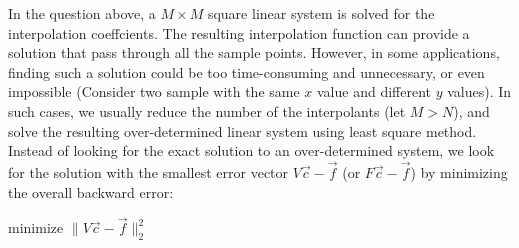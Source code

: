 \documentclass[10pt]{article}
\begin{document}
In the question above, a $M\times M$ square linear system is solved for the interpolation coeffcients.
The resulting interpolation function can provide a solution that pass through all the sample points.
However, in some applications, finding such a solution could be too time-consuming and unnecessary, or even impossible (Consider two sample with the same $x$ value and different $y$ values).
In such cases, we usually reduce the number of the interpolants (let $M>N$), and solve the resulting over-determined linear system using least square method.
Instead of looking for the exact solution to an over-determined system, we look for the solution with the smallest error vector $V\vec{c}-\vec{f}$ (or $F\vec{c}-\vec{f}$) by minimizing the overall backward error:

\begin{center}
minimize $\|V \vec{c}-\vec{f}\|_{2}^{2}$
\end{center}
\end{document}
